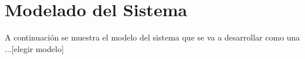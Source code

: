 \section{Modelado del Sistema}\label{sec:modelo}

A continuaci\'on se muestra el modelo del sistema que se va a
desarrollar como una ...[elegir modelo]
